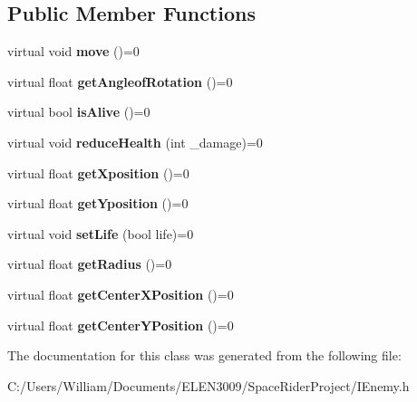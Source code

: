 \subsection*{Public Member Functions}
\begin{DoxyCompactItemize}
\item 
\mbox{\label{class_i_enemy_a0dbed8e8e15436305b6ede08b618c232}} 
virtual void {\bfseries move} ()=0
\item 
\mbox{\label{class_i_enemy_a8a9780d5db69d910f264fd7ab89ebee6}} 
virtual float {\bfseries get\+Angleof\+Rotation} ()=0
\item 
\mbox{\label{class_i_enemy_a3e44ca5e5fabcfd71b26657eba26e5a2}} 
virtual bool {\bfseries is\+Alive} ()=0
\item 
\mbox{\label{class_i_enemy_acbc451cafee99cb405d9d9248820b6ea}} 
virtual void {\bfseries reduce\+Health} (int \+\_\+damage)=0
\item 
\mbox{\label{class_i_enemy_a504ea7fa77b8984d5b9dd71352876943}} 
virtual float {\bfseries get\+Xposition} ()=0
\item 
\mbox{\label{class_i_enemy_a8011be7f510f6630250f8b9529815773}} 
virtual float {\bfseries get\+Yposition} ()=0
\item 
\mbox{\label{class_i_enemy_ab58f2f6c2a8c08730aaf8771f088e1bf}} 
virtual void {\bfseries set\+Life} (bool life)=0
\item 
\mbox{\label{class_i_enemy_ab1fb8f6320916ef6a1497f9651704d05}} 
virtual float {\bfseries get\+Radius} ()=0
\item 
\mbox{\label{class_i_enemy_ab5bc39484a8aeaf278c3d127ec5d9545}} 
virtual float {\bfseries get\+Center\+X\+Position} ()=0
\item 
\mbox{\label{class_i_enemy_ac9a2d69103fa86d8344aa368fb33c714}} 
virtual float {\bfseries get\+Center\+Y\+Position} ()=0
\end{DoxyCompactItemize}


The documentation for this class was generated from the following file\+:\begin{DoxyCompactItemize}
\item 
C\+:/\+Users/\+William/\+Documents/\+E\+L\+E\+N3009/\+Space\+Rider\+Project/I\+Enemy.\+h\end{DoxyCompactItemize}
